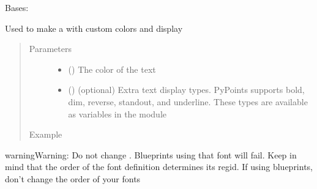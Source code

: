 \documentclass[letterpaper,10pt,english]{sphinxmanual}
\begin{document}
\begin{fulllineitems}
\label{\detokenize{pypoints:pypoints.Font}}
Bases: 

Used to make a {\hyperref[\detokenize{pypoints:pypoints.Point}]{}} with custom colors and display
\begin{quote}\begin{description}
\item[{Parameters}] \leavevmode\begin{itemize}
\item {} 
 ({\hyperref[\detokenize{pypoints:pypoints.Color}]{}}) \textendash{} The color of the text

\item {} 
 () \textendash{} (optional) Extra text display types. PyPoints supports bold, dim, reverse, standout, and underline. These types are available as variables in the module

\end{itemize}

\item[{Example}] \leavevmode
\end{description}\end{quote}

\begin{sphinxVerbatim}[commandchars=\\\{\}]
   
   
      
\end{sphinxVerbatim}

\begin{sphinxadmonition}{warning}{Warning:}
Do not change . Blueprints using that font will fail. Keep in mind that the order of the font definition determines its regid. If using blueprints, don’t change the order of your fonts
\end{sphinxadmonition}



\end{fulllineitems}
\end{document}
